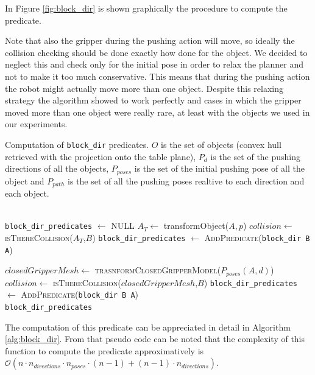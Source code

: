 In Figure \ref{fig:block_dir} is shown graphically the procedure to compute the predicate. 


Note that also the gripper during the pushing action will move, so ideally the collision checking should be done exactly how done for the object. We decided to neglect this and check only for the initial pose in order to relax the planner and not to make it too much conservative. This means that during the pushing action the robot might actually move more than one object. Despite this relaxing strategy the algorithm showed to work perfectly and cases in which the gripper moved more than one object were really rare, at least with the objects we used in our experiments. 

\begin{algorithm}[h]
\caption{Computation of \texttt{block\_dir} predicates. $O$ is the set of objects (convex hull retrieved with the projection onto the table plane), $P_d$ is the set of the pushing directions of all the objects, $P_{poses}$ is the set of the initial pushing pose of all the object and $P_{path}$ is the set of all the pushing poses realtive to each direction and each object.}\label{alg:block_dir}
\begin{algorithmic}
\\
\texttt{block\_dir\_predicates} $\gets$ \textsc{NULL}
  \State $A_T \gets$ {\sc transformObject($A,p$)}
	\State $collision \gets$ \textsc{isThereCollision($A_T$,$B$)}
		\State \texttt{block\_dir\_predicates} $\gets$ \textsc{AddPredicate}(\texttt{block\_dir B A})
	\EndIf
  \EndIf
  \EndFor 
  \EndFor

  \State $closedGripperMesh \gets$ \textsc{trasnformClosedGripperModel}($P_{poses}(A,d)$)
	\State $collision \gets$ \textsc{isThereCollision($closedGripperMesh$,$B$)}
		\State \texttt{block\_dir\_predicates} $\gets$ \textsc{AddPredicate}(\texttt{block\_dir B A})
	\EndIf
  \EndIf
  \EndFor
\EndFor 
\EndFor \\
\Return  \texttt{block\_dir\_predicates}
\EndFunction
\end{algorithmic}
\end{algorithm}  

The computation of this predicate can be appreciated in detail in Algorithm \ref{alg:block_dir}. From that pseudo code can be noted that the complexity of this function to compute the predicate approximatively is $\mathcal{O}(n \cdot n_{directions} \cdot n_{poses}\cdot (n-1) + (n-1)\cdot n_{directions} )$. 

